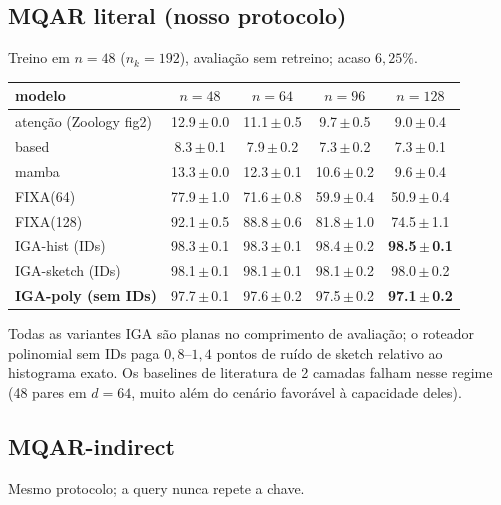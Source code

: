 \documentclass[11pt]{article}
\begin{document}
\subsection{MQAR literal (nosso protocolo)}

Treino em $n=48$ ($n_k=192$), avalia\c{c}\~ao sem retreino; acaso $6{,}25\%$.

\begin{table}[h]\centering
\begin{tabular}{lcccc}
\toprule
modelo & $n{=}48$ & $n{=}64$ & $n{=}96$ & $n{=}128$ \\
\midrule
aten\c{c}\~ao (Zoology fig2) & 12.9\,$\pm$\,0.0 & 11.1\,$\pm$\,0.5 & 9.7\,$\pm$\,0.5 & 9.0\,$\pm$\,0.4 \\
based                   & 8.3\,$\pm$\,0.1  & 7.9\,$\pm$\,0.2  & 7.3\,$\pm$\,0.2 & 7.3\,$\pm$\,0.1 \\
mamba                   & 13.3\,$\pm$\,0.0 & 12.3\,$\pm$\,0.1 & 10.6\,$\pm$\,0.2 & 9.6\,$\pm$\,0.4 \\
FIXA(64)                & 77.9\,$\pm$\,1.0 & 71.6\,$\pm$\,0.8 & 59.9\,$\pm$\,0.4 & 50.9\,$\pm$\,0.4 \\
FIXA(128)               & 92.1\,$\pm$\,0.5 & 88.8\,$\pm$\,0.6 & 81.8\,$\pm$\,1.0 & 74.5\,$\pm$\,1.1 \\
IGA-hist (IDs)          & 98.3\,$\pm$\,0.1 & 98.3\,$\pm$\,0.1 & 98.4\,$\pm$\,0.2 & \textbf{98.5\,$\pm$\,0.1} \\
IGA-sketch (IDs)        & 98.1\,$\pm$\,0.1 & 98.1\,$\pm$\,0.1 & 98.1\,$\pm$\,0.2 & 98.0\,$\pm$\,0.2 \\
\textbf{IGA-poly (sem IDs)} & 97.7\,$\pm$\,0.1 & 97.6\,$\pm$\,0.2 & 97.5\,$\pm$\,0.2 & \textbf{97.1\,$\pm$\,0.2} \\
\bottomrule
\end{tabular}
\end{table}

Todas as variantes IGA s\~ao planas no comprimento de avalia\c{c}\~ao; o roteador
polinomial sem IDs paga $0{,}8$--$1{,}4$ pontos de ru\'ido de sketch relativo ao
histograma exato. Os baselines de literatura de 2 camadas falham nesse regime (48
pares em $d=64$, muito al\'em do cen\'ario favor\'avel \`a capacidade deles).

\subsection{MQAR-indirect}

Mesmo protocolo; a query nunca repete a chave.
\end{document}
